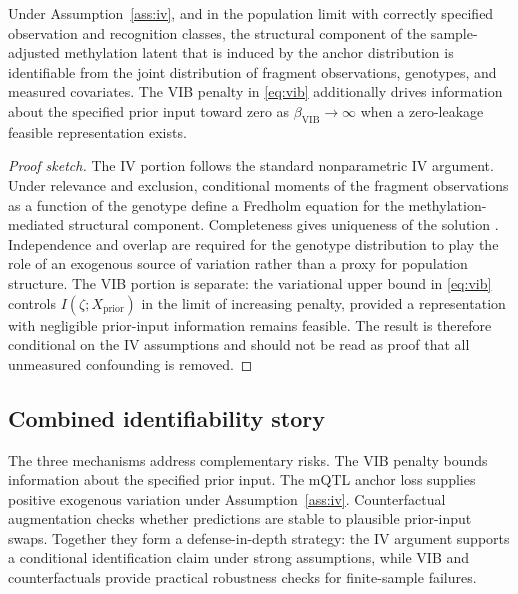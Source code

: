 \begin{proposition}
\label{prop:identify}
Under Assumption~\ref{ass:iv}, and in the population limit with correctly specified observation and recognition classes, the structural component of the sample-adjusted methylation latent that is induced by the anchor distribution is identifiable from the joint distribution of fragment observations, genotypes, and measured covariates. The VIB penalty in \eqref{eq:vib} additionally drives information about the specified prior input toward zero as $\beta_{\mathrm{VIB}}\to\infty$ when a zero-leakage feasible representation exists.
\end{proposition}
\begin{proof}[Proof sketch]
The IV portion follows the standard nonparametric IV argument. Under relevance and exclusion, conditional moments of the fragment observations as a function of the genotype define a Fredholm equation for the methylation-mediated structural component. Completeness gives uniqueness of the solution \citep{newey2003instrumental,darolles2011nonparametric}. Independence and overlap are required for the genotype distribution to play the role of an exogenous source of variation rather than a proxy for population structure. The VIB portion is separate: the variational upper bound in \eqref{eq:vib} controls $I(\zeta;X_{\mathrm{prior}})$ in the limit of increasing penalty, provided a representation with negligible prior-input information remains feasible. The result is therefore conditional on the IV assumptions and should not be read as proof that all unmeasured confounding is removed.
\end{proof}

\subsection{Combined identifiability story}
The three mechanisms address complementary risks. The VIB penalty bounds information about the specified prior input. The mQTL anchor loss supplies positive exogenous variation under Assumption~\ref{ass:iv}. Counterfactual augmentation checks whether predictions are stable to plausible prior-input swaps. Together they form a defense-in-depth strategy: the IV argument supports a conditional identification claim under strong assumptions, while VIB and counterfactuals provide practical robustness checks for finite-sample failures.

